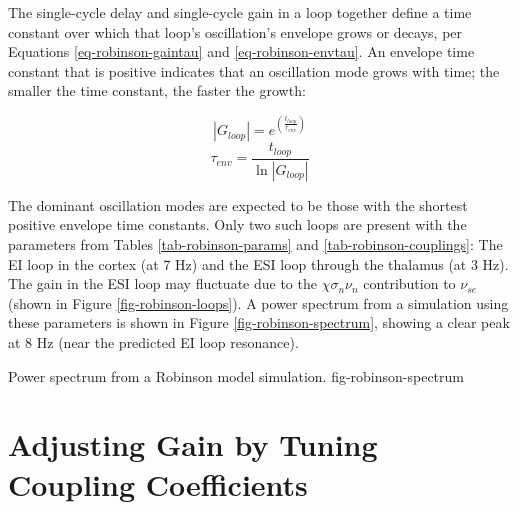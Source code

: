 The single-cycle delay and single-cycle gain in a loop together define a time
constant over which that loop's oscillation's envelope grows or decays,
per Equations \ref{eq-robinson-gaintau} and \ref{eq-robinson-envtau}.
An envelope time constant that is positive indicates that an oscillation
mode grows with time; the smaller the time constant, the faster the growth:

\begin{equation}
| G_{loop} | = e^{\left ( \frac{t_{loop}}{\tau_{env}} \right )}
\label{eq-robinson-gaintau}
\end{equation}
%
\begin{equation}
\tau_{env} = \frac{t_{loop}}{\ln | G_{loop} |}
\label{eq-robinson-envtau}
\end{equation}

The dominant oscillation modes are expected to be those with the shortest
positive envelope time constants. Only two such loops are present with the
parameters from Tables \ref{tab-robinson-params} and
\ref{tab-robinson-couplings}: The EI loop in the cortex (at 7 Hz) and the
ESI loop through the thalamus (at 3 Hz). The gain in the ESI loop may
fluctuate due to the $\chi \sigma_n \nu_n$ contribution to $\nu_{se}$ (shown
in Figure \ref{fig-robinson-loops}). A power spectrum from a simulation
using these parameters is shown in Figure \ref{fig-robinson-spectrum},
showing a clear peak at 8 Hz (near the predicted EI loop resonance).

{Power spectrum from a Robinson model simulation.}
{fig-robinson-spectrum}

%
%
\section{Adjusting Gain by Tuning Coupling Coefficients}
\label{sect-robinson-math-tuning}
%
\newcommand{\deln}{\nabla_{\mathbf{N}}}

